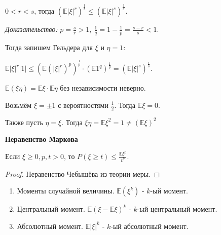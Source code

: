 \begin{properties}
\begin{enumerate}
{            $0 < r < s$, тогда $(\mathbb{E} |\xi| ^ r)^{\frac{1}{r}} \leqslant (\mathbb{E}|\xi|^s)^{\frac{1}{s}}$.

            \textit{Доказательство:} $p = \frac{s}{r} > 1, \ \frac{1}{q} = 1 - \frac{1}{p} = \frac{s - r}{s} < 1$.

            Тогда запишем Гельдера для $\xi$ и $\eta = 1$:

            $\mathbb{E} |\xi|^r |1| \leq \left(\mathbb{E} (|\xi|^r)^p \right)^{\frac{1}{p}} \cdot \left( \mathbb{E} 1^q \right)^{\frac{1}{q}} = \left( \mathbb{E} |\xi|^s \right)^{\frac{r}{s}}$.


        }
    \end{enumerate}
\end{properties}

\begin{remark}
    $\mathbb{E}(\xi \eta) = \mathbb{E}\xi \cdot \mathbb{E} \eta$ без независимости неверно.

    Возьмём $\xi = \pm 1$ с вероятностями $\frac{1}{2}$. Тогда $\mathbb{E} \xi = 0$.

    Также пусть $\eta = \xi$. Тогда $\mathbb{\xi \eta} = \mathbb{E} \xi^2 = 1 \neq (\mathbb{E} \xi)^2$
\end{remark}

\begin{theorem}
    \textbf{Неравенство Маркова}

    Если $\xi \geqslant 0, p, t > 0$, то $P(\xi \geqslant t) \leqslant \frac{\mathbb{E}\xi^p}{t^p}$.
\end{theorem}

\begin{proof}
    Неравенство Чебышёва из теории меры.
\end{proof}

\begin{definition}
    \begin{enumerate}
        \item Моменты случайной величины. $\mathbb{E} (\xi^k)$ - $k$-ый момент.
        \item Центральный момент. $\mathbb{E}(\xi - \mathbb{E}\xi)^k$ - $k$-ый центральный момент.
        \item Абсолютный момент. $\mathbb{E}|\xi|^k$ - $k$-ый абсолютный момент.
    \end{enumerate}
\end{definition}


